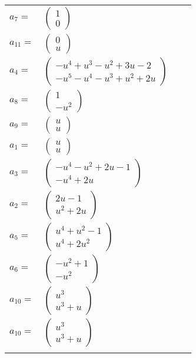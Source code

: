 \documentclass[1p]{elsarticle_modified}
\theoremstyle{definition}
\begin{document}
\begin{tabular}{m{7pt} m{180pt} m{7pt} m{180pt} }
\flushright $a_{7}=$&$\begin{pmatrix}1\\0\end{pmatrix}$ \\
\flushright $a_{11}=$&$\begin{pmatrix}0\\u\end{pmatrix}$ \\
\flushright $a_{4}=$&$\begin{pmatrix}- u^4+u^3- u^2+3 u-2\\- u^5- u^4- u^3+u^2+2 u\end{pmatrix}$ \\
\flushright $a_{8}=$&$\begin{pmatrix}1\\- u^2\end{pmatrix}$ \\
\flushright $a_{9}=$&$\begin{pmatrix}u\\u\end{pmatrix}$ \\
\flushright $a_{1}=$&$\begin{pmatrix}u\\u\end{pmatrix}$ \\
\flushright $a_{3}=$&$\begin{pmatrix}- u^4- u^2+2 u-1\\- u^4+2 u\end{pmatrix}$ \\
\flushright $a_{2}=$&$\begin{pmatrix}2 u-1\\u^2+2 u\end{pmatrix}$ \\
\flushright $a_{5}=$&$\begin{pmatrix}u^4+u^2-1\\u^4+2 u^2\end{pmatrix}$ \\
\flushright $a_{6}=$&$\begin{pmatrix}- u^2+1\\- u^2\end{pmatrix}$ \\
\flushright $a_{10}=$&$\begin{pmatrix}u^3\\u^3+u\end{pmatrix}$\\ \flushright $a_{10}=$&$\begin{pmatrix}u^3\\u^3+u\end{pmatrix}$\\&\end{tabular}
\end{document}

